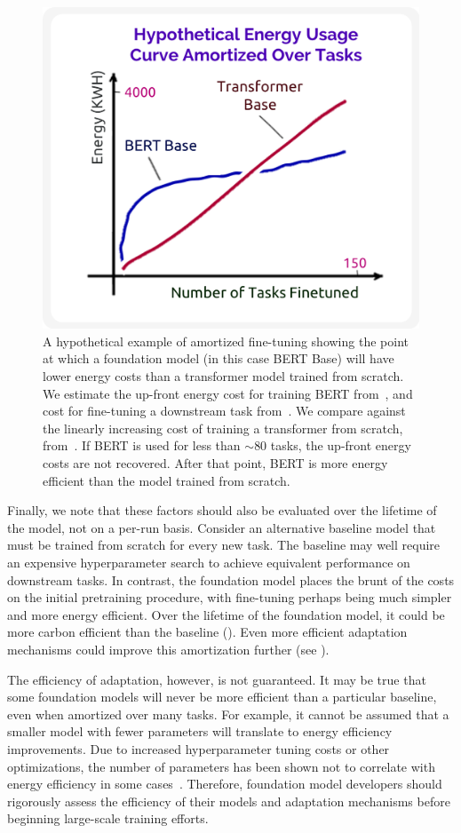 \begin{figure}[t]
    \centering
    \includegraphics[width=.55\textwidth]{society/figures/Environment_Plot.png}
    \caption{A hypothetical example of amortized fine-tuning showing the point at which a foundation model (in this case BERT Base) will have lower energy costs than a transformer model trained from scratch. We estimate the up-front energy cost for training BERT from~\citet{strubell2019energy}, and cost for fine-tuning a downstream task from~\citet{chaudhary2020topicbert}. We compare against the linearly increasing cost of training a transformer from scratch, from~\citet{strubell2019energy}. If BERT is used for less than $\sim$80 tasks, the up-front energy costs are not recovered. After that point, BERT is  more energy efficient than the model trained from scratch.}
    \label{fig:env_bert_fine-tune}
\end{figure}

Finally, we note that these factors should also be evaluated over the lifetime of the model, not on a per-run basis. Consider an alternative baseline model that must be trained from scratch for every new task. The baseline may well require an expensive hyperparameter search to achieve equivalent performance on downstream tasks. In contrast, the foundation model places the brunt of the costs on the initial pretraining procedure, with fine-tuning perhaps being much simpler and more energy efficient. Over the lifetime of the foundation model, it could be more carbon efficient than the baseline  (). 
Even more efficient adaptation mechanisms could improve this amortization further (see ).

The efficiency of adaptation, however, is not guaranteed. It may be true that some foundation models will never be more efficient than a particular baseline, even when amortized over many tasks.
For example, it cannot be assumed that a smaller model with fewer parameters will translate to energy efficiency improvements. Due to increased hyperparameter tuning costs or other optimizations, the number of parameters has been shown not to correlate with energy efficiency in some cases~\citep{zhou2020hulk,henderson2020towards}.
Therefore, foundation model developers should rigorously assess the efficiency of their models and adaptation mechanisms before beginning large-scale training efforts.

